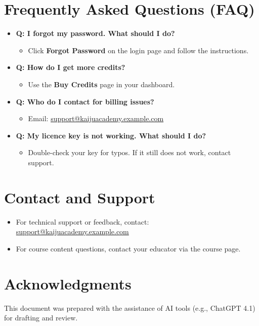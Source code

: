 \documentclass[a4paper,11pt]{scrartcl}
\begin{document}
\section{Frequently Asked Questions (FAQ)}

\begin{itemize}[leftmargin=*]
    \item \textbf{Q: I forgot my password. What should I do?}
    \begin{itemize}
        \item Click \textbf{Forgot Password} on the login page and follow the instructions.
    \end{itemize}
    \item \textbf{Q: How do I get more credits?}
    \begin{itemize}
        \item Use the \textbf{Buy Credits} page in your dashboard.
    \end{itemize}
    \item \textbf{Q: Who do I contact for billing issues?}
    \begin{itemize}
        \item Email: \href{mailto:support@kaijuacademy.example.com}{support@kaijuacademy.example.com}
    \end{itemize}
    \item \textbf{Q: My licence key is not working. What should I do?}
    \begin{itemize}
        \item Double-check your key for typos. If it still does not work, contact support.
    \end{itemize}
\end{itemize}

\section{Contact and Support}
\begin{itemize}[leftmargin=*]
    \item For technical support or feedback, contact: \href{mailto:support@kaijuacademy.example.com}{support@kaijuacademy.example.com}
    \item For course content questions, contact your educator via the course page.
\end{itemize}

\section{Acknowledgments}
This document was prepared with the assistance of AI tools (e.g., ChatGPT 4.1) for drafting and review.
\end{document}
